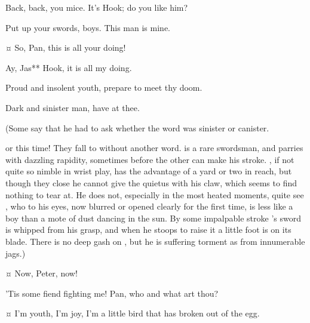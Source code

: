 \begin{drama}
\hookspeaks
Back, back, you mice.
It's Hook; do you like him?

\peterspeaks
Put up your swords, boys.
This man is mine.


\hookspeaks {}¤
So, Pan, this is all your doing!

\peterspeaks
Ay, Jas** Hook, it is all my doing.

\hookspeaks
Proud and insolent youth, prepare to meet thy doom.

\peterspeaks
Dark and sinister man, have at thee.

\begin{stagedir}
(Some say that he had to ask \tootles whether the word was sinister or canister.

\hook or \peter this time!
They fall to without another word.
\peter is a rare swordsman, and parries with dazzling rapidity,
sometimes before the other can make his stroke.
\hook, if not quite so nimble in wrist play, has the advantage of a yard or two in reach,
but though they close he cannot give the quietus with his claw, which seems to find nothing to tear at.
He does not, especially in the most heated moments, quite see \peter,
who to his eyes, now blurred or opened clearly for the first time,
is less like a boy than a mote of dust dancing in the sun.
By some impalpable stroke \hook's sword is whipped from his grasp,
and when he stoops to raise it a little foot is on its blade.
There is no deep gash on \hook, but he is suffering torment as from innumerable jags.)
\end{stagedir}

 ¤
Now, Peter, now!


\hookspeaks
'Tis some fiend fighting me!
Pan, who and what art thou?


\peterspeaks {}¤
I'm youth, I'm joy, I'm a little bird that has broken out of the egg.


\end{drama}
